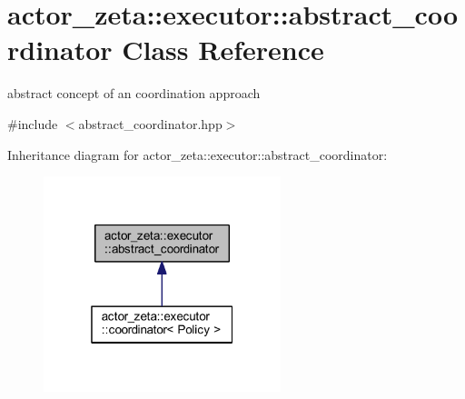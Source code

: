 \hypertarget{classactor__zeta_1_1executor_1_1abstract__coordinator}{}\section{actor\+\_\+zeta\+:\+:executor\+:\+:abstract\+\_\+coordinator Class Reference}
\label{classactor__zeta_1_1executor_1_1abstract__coordinator}


abstract concept of an coordination approach  




{\ttfamily \#include $<$abstract\+\_\+coordinator.\+hpp$>$}



Inheritance diagram for actor\+\_\+zeta\+:\+:executor\+:\+:abstract\+\_\+coordinator\+:\nopagebreak
\begin{figure}[H]
\begin{center}
\leavevmode
\includegraphics[width=196pt]{classactor__zeta_1_1executor_1_1abstract__coordinator__inherit__graph}
\end{center}
\end{figure}

